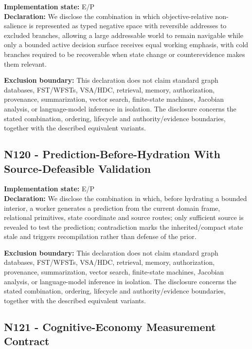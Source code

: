 \documentclass[
  10pt,
  letterpaper,
]{article}
\begin{document}
\textbf{Implementation state:} E/P\\
\textbf{Declaration:} We disclose the combination in which
objective-relative non-salience is represented as typed negative space
with reversible addresses to excluded branches, allowing a large
addressable world to remain navigable while only a bounded active
decision surface receives equal working emphasis, with cold branches
required to be recoverable when state change or counterevidence makes
them relevant.

\textbf{Exclusion boundary:} This declaration does not claim standard
graph databases, FST/WFSTs, VSA/HDC, retrieval, memory, authorization,
provenance, summarization, vector search, finite-state machines,
Jacobian analysis, or language-model inference in isolation. The
disclosure concerns the stated combination, ordering, lifecycle and
authority/evidence boundaries, together with the described equivalent
variants.

\subsection{N120 - Prediction-Before-Hydration With Source-Defeasible
Validation}\label{n120---prediction-before-hydration-with-source-defeasible-validation}

\textbf{Implementation state:} E/P\\
\textbf{Declaration:} We disclose the combination in which, before
hydrating a bounded interior, a worker generates a prediction from the
current domain frame, relational primitives, state coordinate and source
routes; only sufficient source is revealed to test the prediction;
contradiction marks the inherited/compact state stale and triggers
recompilation rather than defense of the prior.

\textbf{Exclusion boundary:} This declaration does not claim standard
graph databases, FST/WFSTs, VSA/HDC, retrieval, memory, authorization,
provenance, summarization, vector search, finite-state machines,
Jacobian analysis, or language-model inference in isolation. The
disclosure concerns the stated combination, ordering, lifecycle and
authority/evidence boundaries, together with the described equivalent
variants.

\subsection{N121 - Cognitive-Economy Measurement
Contract}\label{n121---cognitive-economy-measurement-contract}
\end{document}
